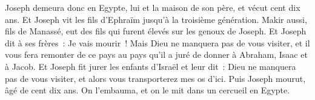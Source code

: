\begin{multicols}{2}
Joseph demeura donc en Egypte, lui et la maison de son père, et vécut cent dix ans.
Et Joseph vit les fils d'Ephraïm jusqu'à la troisième génération. Makir aussi, fils de Manassé, eut des fils qui furent élevés sur les genoux de Joseph.
Et Joseph dit à ses frères~: Je vais mourir~! Mais Dieu ne manquera pas de vous visiter, et il vous fera remonter de ce pays au pays qu'il a juré de donner à Abraham, Isaac et à Jacob.
Et Joseph fit jurer les enfants d'Israël et leur dit~: Dieu ne manquera pas de vous visiter, et alors vous transporterez mes os d'ici.
Puis Joseph mourut, âgé de cent dix ans. On l'embauma, et on le mit dans un cercueil en Egypte.
\PPE{}
\end{multicols}
